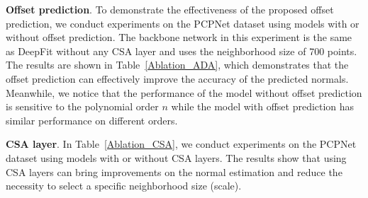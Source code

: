 \begin{table}[]
\begin{center}
    \vspace{-0.4cm}
\end{center}

\caption{Normal RMSE of models using thresholds to truncate points and the model with offset prediction on the PCPNet dataset. The first row shows the truncation thresholds.}
\vspace{-0.4cm}
\label{fig:truncate}
\end{table}


\textbf{Offset prediction}. To demonstrate the effectiveness of the proposed offset prediction, we conduct experiments on the PCPNet dataset using models with or without offset prediction. The backbone network in this experiment is the same as DeepFit without any CSA layer and uses the neighborhood size of 700 points. The results are shown in Table~\ref{Ablation_ADA}, which demonstrates that the offset prediction can effectively improve the accuracy of the predicted normals. Meanwhile, we notice that the performance of the model without offset prediction is sensitive to the polynomial order $n$ while the model with offset prediction has similar performance on different orders.

\textbf{CSA layer}. In Table~\ref{Ablation_CSA}, we conduct experiments on the PCPNet dataset using models with or without CSA layers. The results show that using CSA layers can bring improvements on the normal estimation and reduce the necessity to select a specific neighborhood size (scale).

